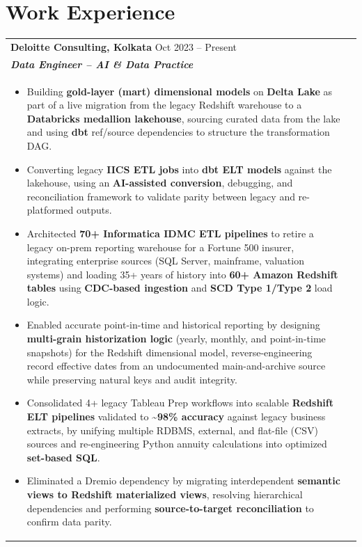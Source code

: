 \documentclass[a4paper,8pt]{article}
\begin{document}
\section{Work Experience}
\begin{tabularx}{\linewidth}{ @{}l r@{} }
\textbf{{Deloitte Consulting, Kolkata}} \hfill \color[HTML]{371e77} Oct 2023 -- Present \\[4pt]
\color[HTML]{371e77}\textbf{\textit{Data Engineer -- AI \& Data Practice}}\ \hfill \color[HTML]{4B28A4} \\[5pt]
\begin{minipage}[t]{\linewidth}
    \begin{itemize}[nosep,after=\strut, leftmargin=2em, itemsep=2pt]
        \item Building \textbf{gold-layer (mart) dimensional models} on \textbf{Delta Lake} as part of a live migration from the legacy Redshift warehouse to a \textbf{Databricks medallion lakehouse}, sourcing curated data from the lake and using \textbf{dbt} ref/source dependencies to structure the transformation DAG.
        \item Converting legacy \textbf{IICS ETL jobs} into \textbf{dbt ELT models} against the lakehouse, using an \textbf{AI-assisted conversion}, debugging, and reconciliation framework to validate parity between legacy and re-platformed outputs.
        \item Architected \textbf{70+ Informatica IDMC ETL pipelines} to retire a legacy on-prem reporting warehouse for a Fortune 500 insurer, integrating enterprise sources (SQL Server, mainframe, valuation systems) and loading 35+ years of history into \textbf{60+ Amazon Redshift tables} using \textbf{CDC-based ingestion} and \textbf{SCD Type 1/Type 2} load logic.
        \item Enabled accurate point-in-time and historical reporting by designing \textbf{multi-grain historization logic} (yearly, monthly, and point-in-time snapshots) for the Redshift dimensional model, reverse-engineering record effective dates from an undocumented main-and-archive source while preserving natural keys and audit integrity.
        \item Consolidated 4+ legacy Tableau Prep workflows into scalable \textbf{Redshift ELT pipelines} validated to \textbf{\textasciitilde98\% accuracy} against legacy business extracts, by unifying multiple RDBMS, external, and flat-file (CSV) sources and re-engineering Python annuity calculations into optimized \textbf{set-based SQL}.
        \item Eliminated a Dremio dependency by migrating interdependent \textbf{semantic views to Redshift materialized views}, resolving hierarchical dependencies and performing \textbf{source-to-target reconciliation} to confirm data parity.

\end{itemize}
\end{minipage}
\end{tabularx}
\end{document}
